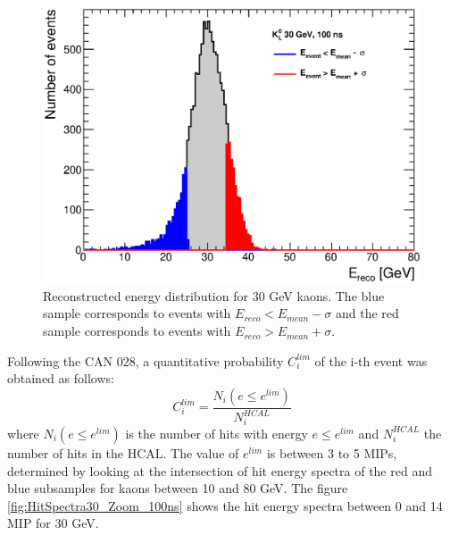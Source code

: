 \begin{figure}[htbp!]
  \centering
  \includegraphics[width=0.6\linewidth]{../Thesis_Plots/ILD/AdditionalPlots/Plots/EnergySum_100ns_30GeV.eps}
  \caption{Reconstructed energy distribution for 30 GeV kaons. The blue sample corresponds to events with $E_{reco} < E_{mean} - \sigma$ and the red sample corresponds to events with $E_{reco} > E_{mean} + \sigma$.} \label{fig:Esum30_100ns}
\end{figure}

Following the CAN 028, a quantitative probability $C_{i}^{lim}$ of the i-th event was obtained as follows:
\begin{equation}
  C_{i}^{lim} = \frac{N_{i}(e \leq e^{lim})}{N_{i}^{HCAL}}
\end{equation}
where $N_{i}(e \leq e^{lim})$ is the number of hits with energy $e \leq e^{lim}$ and $N_{i}^{HCAL}$ the number of hits in the HCAL. The value of $e^{lim}$ is between 3 to 5 MIPs, determined by looking at the intersection of hit energy spectra of the red and blue subsamples for kaons between 10 and 80 GeV. The figure \ref{fig:HitSpectra30_Zoom_100ns} shows the hit energy spectra between 0 and 14 MIP for 30 GeV.

